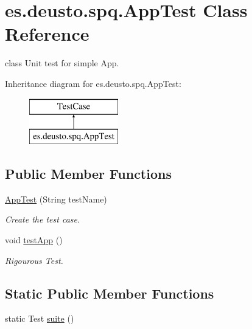 \hypertarget{classes_1_1deusto_1_1spq_1_1AppTest}{}\section{es.\+deusto.\+spq.\+App\+Test Class Reference}
\label{classes_1_1deusto_1_1spq_1_1AppTest}


class Unit test for simple App.  


Inheritance diagram for es.\+deusto.\+spq.\+App\+Test\+:\begin{figure}[H]
\begin{center}
\leavevmode
\includegraphics[height=2.000000cm]{classes_1_1deusto_1_1spq_1_1AppTest}
\end{center}
\end{figure}
\subsection*{Public Member Functions}
\begin{DoxyCompactItemize}
\item 
\hyperlink{classes_1_1deusto_1_1spq_1_1AppTest_a972284322afe0fcb22d82f0209af089a}{App\+Test} (String test\+Name)
\begin{DoxyCompactList}\small\item\em Create the test case. \end{DoxyCompactList}\item 
\mbox{\label{classes_1_1deusto_1_1spq_1_1AppTest_afe47d45327289bf35acf77252c8e5273}} 
void \hyperlink{classes_1_1deusto_1_1spq_1_1AppTest_afe47d45327289bf35acf77252c8e5273}{test\+App} ()
\begin{DoxyCompactList}\small\item\em Rigourous Test. \end{DoxyCompactList}\end{DoxyCompactItemize}
\subsection*{Static Public Member Functions}
\begin{DoxyCompactItemize}
\item 
static Test \hyperlink{classes_1_1deusto_1_1spq_1_1AppTest_ac59db16cf8210db66a8f053d62f455f8}{suite} ()
\end{DoxyCompactItemize}


